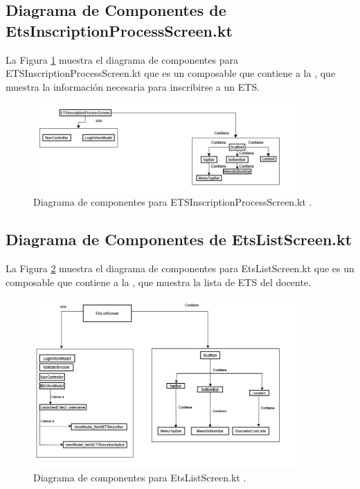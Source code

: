\newpage

\subsection{Diagrama de Componentes de EtsInscriptionProcessScreen.kt}

La Figura \ref{fig:Componentes_8} muestra el diagrama de componentes para ETSInscriptionProcessScreen.kt que es un composable que contiene a la , que muestra la información necesaria para inscribirse a un ETS.

\begin{figure}[htbp!]
	\begin{center}
		\includegraphics[width=0.9\textwidth]{DiagramasMoviles/DCM (21)}
		\caption{Diagrama de componentes para ETSInscriptionProcessScreen.kt .}
		\label{fig:Componentes_8}
	\end{center}
\end{figure}

\newpage

\subsection{Diagrama de Componentes de EtsListScreen.kt}

La Figura \ref{fig:Componentes_9} muestra el diagrama de componentes para EtsListScreen.kt que es un composable que contiene a la , que muestra la lista de ETS del docente.

\begin{figure}[htbp!]
	\begin{center}
		\includegraphics[width=0.9\textwidth]{DiagramasMoviles/DCM (22)}
		\caption{Diagrama de componentes para EtsListScreen.kt .}
		\label{fig:Componentes_9}
	\end{center}
\end{figure}

